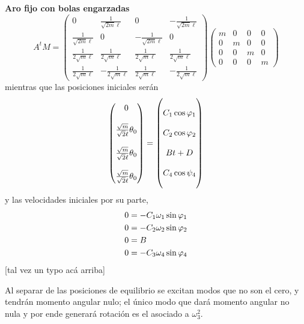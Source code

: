 \documentclass[10pt,oneside]{CBFT_book}
\begin{document}
\begin{ejemplo}{\bf Aro fijo con bolas engarzadas}
\[
	A^t M = \begin{pmatrix}
	        0 & \frac{1}{\sqrt{2m}\ell} & 0 & -\frac{1}{\sqrt{2m}\ell} \\
	        \frac{1}{\sqrt{2m}\ell} & 0 & -\frac{1}{\sqrt{2m}\ell} & 0 \\
	        \frac{1}{2\sqrt{m}\ell} & \frac{1}{2\sqrt{m}\ell} & \frac{1}{2\sqrt{m}\ell} & \frac{1}{2\sqrt{m}\ell} \\
	        \frac{1}{2\sqrt{m}\ell} & -\frac{1}{2\sqrt{m}\ell} & \frac{1}{2\sqrt{m}\ell} & -\frac{1}{2\sqrt{m}\ell} 
	        \end{pmatrix}
	        \begin{pmatrix}
	         m & 0 & 0 & 0 \\
	         0 & m & 0 & 0 \\
	         0 & 0 & m & 0 \\
	         0 & 0 & 0 & m 
	        \end{pmatrix}
\]
mientras que las posiciones iniciales serán 
\[
	\begin{pmatrix}
	0 \\
	\\
	\frac{\sqrt{m}}{\sqrt{2}\ell} \theta_0 \\
	\\
	\frac{\sqrt{m}}{\sqrt{2}\ell} \theta_0 \\
	\\
	\frac{\sqrt{m}}{\sqrt{2}\ell} \theta_0
	\end{pmatrix} =
	\begin{pmatrix}
	\\
	C_1 \cos\varphi_1 \\
	\\
	C_2 \cos\varphi_2 \\
	\\
	Bt + D \\
	\\
	C_4 \cos\psi_4 \\
	\\
	\end{pmatrix}
\]
y las velocidades iniciales por su parte,
\begin{align*}
	0 & = - C_1 \omega_1 \sin \varphi_1 \\
	0 & = - C_2 \omega_2 \sin \varphi_2 \\
	0 & = B \\
	0 & = - C_3 \omega_4 \sin \varphi_4 
\end{align*}
[tal vez un typo acá arriba]

Al separar de las posiciones de equilibrio se excitan modos que no son el cero, y tendrán momento angular nulo; el
único modo que dará momento angular no nula y por ende generará rotación es el asociado a $\omega_3^2$.


\end{ejemplo}
\end{document}
